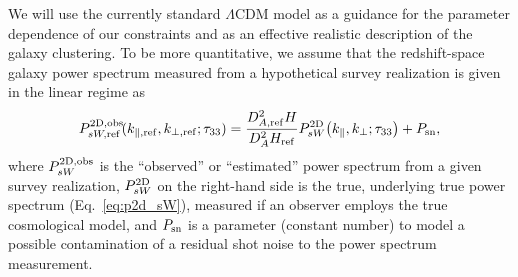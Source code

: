 \documentclass[prd,onecolumn,notitlepage,amsmath,amssymb,floatfix,superscriptaddress]{revtex4-1}
\begin{document}
We will use the currently standard $\Lambda$CDM model as a guidance for
the parameter dependence of our constraints and as an effective
realistic description of the galaxy clustering. 
To be more quantitative, we assume that 
the redshift-space galaxy power spectrum measured from a hypothetical 
survey realization 
is given in the linear regime as
%
\begin{eqnarray}
 P^{\rm 2D, obs}_{sW, {\rm ref}}\!(k_{\parallel, {\rm ref}},k_{\perp, {\rm ref}};
  \tau_{33})
  =
\frac{D_{A,{\rm
 ref} }^2 H}
{D_A^2 H_{\rm ref}}
P^{\rm 2D}_{sW}\!\left(k_{\parallel},k_{\perp}; \tau_{33}\right)+P_{\rm sn},
\label{eq:Pg}
\end{eqnarray}
%
where $P^{\rm 2D, obs}_{sW}$ is the ``observed'' or ``estimated''
power spectrum from a given survey realization, $P^{\rm 2D}_{sW}$ on the right-hand
 side is the true, underlying true power spectrum (Eq.~\ref{eq:p2d_sW}), measured if an observer employs the true 
cosmological model,  and $P_{\rm
sn}$ is a parameter (constant number) to model a possible contamination of a residual shot
noise to the power spectrum measurement. 
\end{document}

